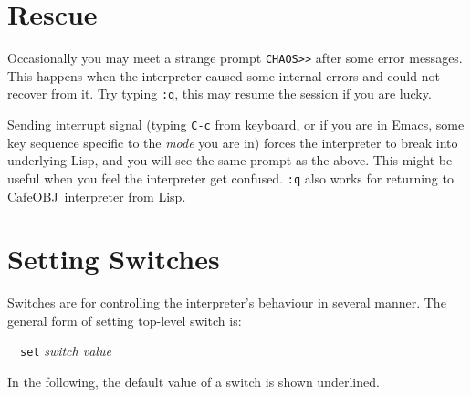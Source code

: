 \documentclass[a4paper,oneside,twocolumn]{memoir}
\def\<#1>{\textit{#1\/}}
\def\kbd#1{\texttt{#1}\null}        %
\def\cafeobj{{CafeOBJ}\null}
\begin{document}
\section{Rescue}

Occasionally you may meet a strange prompt \kbd{CHAOS>>} after some
error messages. This happens when the interpreter caused some internal
errors and could not recover from it. Try typing \kbd{:q}, this may
resume the session if you are lucky. 

Sending interrupt signal (typing \kbd{C-c} from keyboard, or if you
are in Emacs, some key sequence specific to the \<mode> you are in)
forces the interpreter to break into underlying Lisp, and you will see
the same prompt as the above. 
This might be useful when you feel the interpreter get confused.
\kbd{:q} also works for returning to \cafeobj\ interpreter from Lisp.

\section{Setting Switches}

Switches are for controlling the interpreter's behaviour in several manner.
The general form of setting top-level switch is:

\ \ \kbd{set} {\textit{switch value\/} }

In the following, the default value of a switch is shown
underlined.
\end{document}
